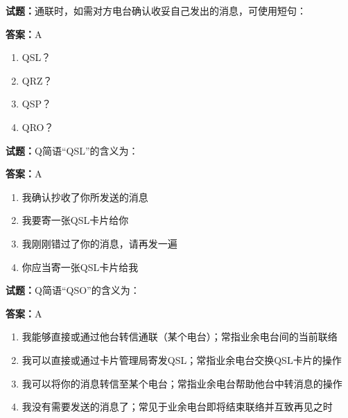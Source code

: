 \documentclass{ctexbook}
\begin{document}




\vspace{1em}

\textbf{试题：}通联时，如需对方电台确认收妥自己发出的消息，可使用短句： 

\textbf{答案：}A 

\begin{enumerate}[leftmargin=3em]
  \item QSL？ 

  \item QRZ？ 

  \item QSP？ 

  \item QRO？ 

\end{enumerate}






\vspace{1em}

\textbf{试题：}Q简语“QSL”的含义为： 

\textbf{答案：}A 

\begin{enumerate}[leftmargin=3em]
  \item 我确认抄收了你所发送的消息 

  \item 我要寄一张QSL卡片给你 

  \item 我刚刚错过了你的消息，请再发一遍 

  \item 你应当寄一张QSL卡片给我 

\end{enumerate}





\vspace{1em}

\textbf{试题：}Q简语“QSO”的含义为： 

\textbf{答案：}A 

\begin{enumerate}[leftmargin=3em]
  \item 我能够直接或通过他台转信通联（某个电台）；常指业余电台间的当前联络 

  \item 我可以直接或通过卡片管理局寄发QSL；常指业余电台交换QSL卡片的操作 

  \item 我可以将你的消息转信至某个电台；常指业余电台帮助他台中转消息的操作 

  \item 我没有需要发送的消息了；常见于业余电台即将结束联络并互致再见之时 

\end{enumerate}
\end{document}

